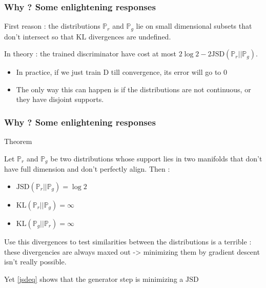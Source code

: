\documentclass[french,9pt]{beamer}
\begin{document}
\begin{frame}
\frametitle{Why ? Some enlightening responses \cite{arjovsky_towards_2017}}

First reason : the distributions $\mathbb{P}_{r}$ and $\mathbb{P}_{g}$ lie on small dimensional subsets that don't intersect so that $\text{KL}$ divergences are undefined.

\pause

In theory : the trained discriminator have cost at most $2 \log 2 - 2 \text{JSD}(\mathbb{P}_{r}||\mathbb{P}_{g})$.
\begin{itemize}
\item  In practice, if we just train D till convergence, its error will go to 0
\item The only way this can happen is if the distributions are not continuous, or they have disjoint supports.
\end{itemize}


\end{frame}



\begin{frame}
\frametitle{Why ? Some enlightening responses \cite{arjovsky_towards_2017}}



\begin{block}{Theorem}

Let $\mathbb{P}_{r}$ and $\mathbb{P}_{g}$ be two distributions whose support lies in two manifolds that don’t have full dimension and don’t perfectly align. Then :
\begin{itemize}
\item $\text{JSD}(\mathbb{P}_{r}||\mathbb{P}_{g})=\log 2$
\item $\text{KL}(\mathbb{P}_{r}||\mathbb{P}_{g})=\infty$
\item $\text{KL}(\mathbb{P}_{g}||\mathbb{P}_{r})=\infty$
\end{itemize}
\end{block}

\pause

Use this divergences to test similarities between the distributions is a terrible : these divergencies are always maxed out -> minimizing them by gradient descent isn’t really possible. 

Yet \eqref{jsdeq} shows that the generator step is minimizing a $\text{JSD}$

\end{frame}
\end{document}
